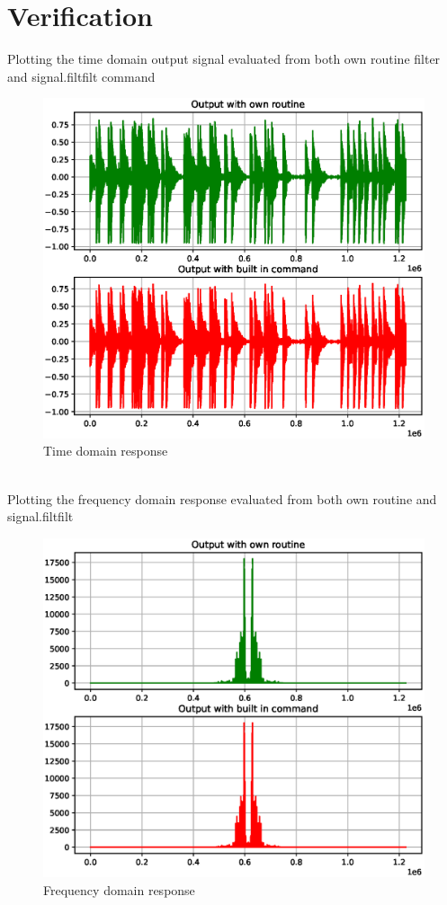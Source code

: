 \documentclass[journal,12pt,twocolumn]{IEEEtran}
\begin{document}
\section{Verification}
Plotting the time domain output signal evaluated from both own routine filter and signal.filtfilt command
\begin{figure}[!h]
\centering
\includegraphics[width=1.2\columnwidth]{./figs/ee18btech11034_1.eps}
\caption{Time domain response}
\label{fig:Figure1}
\end{figure}
\\
Plotting the frequency domain response evaluated from both own routine and signal.filtfilt
\begin{figure}[!h]
\centering
\includegraphics[width=1.2\columnwidth]{./figs/ee18btech11034_2.eps}
\caption{Frequency domain response}
\label{fig:Figure2}
\end{figure}
\end{document}
